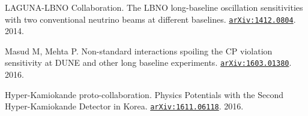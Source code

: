 \begin{thebibliography}{100}
	 LAGUNA-LBNO Collaboration. The LBNO long-baseline
		oscillation sensitivities with two conventional neutrino beams at different
		baselines.
		\href{https://arxiv.org/abs/1412.0804}{\texttt{arXiv:1412.0804}}. 2014.

	 Masud M, Mehta P. Non-standard interactions spoiling the CP
		violation sensitivity at DUNE and other long baseline experiments.
		\href{https://arxiv.org/abs/1603.01380}{\texttt{arXiv:1603.01380}}. 2016.

	 Hyper-Kamiokande proto-collaboration. Physics Potentials with
		the Second Hyper-Kamiokande Detector in Korea.
		\href{https://arxiv.org/abs/1611.06118}{\texttt{arXiv:1611.06118}}. 2016.



\end{thebibliography}
